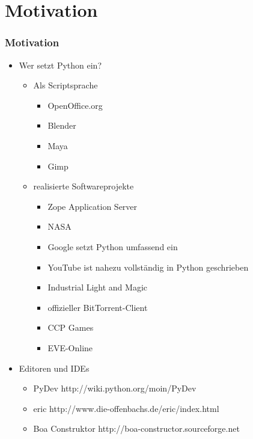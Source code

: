 \documentclass[10pt]{beamer}
\begin{document}
\section{Motivation}
 \begin{frame}
  \frametitle{Motivation}
  \begin{itemize}
   \item Wer setzt Python ein?
    \begin{itemize}
     \item Als Scriptsprache
      \begin{itemize}
       \item OpenOffice.org
       \item Blender
       \item Maya
       \item Gimp
      \end{itemize}
     \item realisierte Softwareprojekte
      \begin{itemize}
       \item Zope Application Server
       \item NASA
       \item Google setzt Python umfassend ein
       \item YouTube ist nahezu vollständig in Python geschrieben
       \item Industrial Light and Magic
       \item offizieller BitTorrent-Client
       \item CCP Games
       \item EVE-Online
      \end{itemize}
    \end{itemize}
   \item Editoren und IDEs
    \begin{itemize}
     \item PyDev http://wiki.python.org/moin/PyDev
     \item eric http://www.die-offenbachs.de/eric/index.html
     \item Boa Construktor http://boa-constructor.sourceforge.net
    \end{itemize}
  \end{itemize}

 \end{frame}


%
%   
%
%
\end{document}
